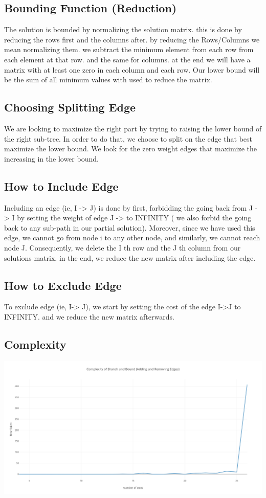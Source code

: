 \documentclass[11pt, english]{article}
\begin{document}
\subsection{Bounding Function (Reduction)}
The solution is bounded by normalizing the solution matrix. this is done by reducing the rows first and the columns after.
by reducing the Rows/Columns we mean normalizing them. we subtract the minimum element from each row from each element at that row. and the same for columns. at the end we will have a matrix with at least one zero in each column and each row.
Our lower bound will be the sum of all minimum values with used to reduce the matrix.

\subsection{Choosing Splitting Edge}
We are looking to maximize the right part by trying to raising the lower bound of the right sub-tree. In order to do that, we choose to split on the edge that best maximize the lower bound. We look for the zero weight edges that maximize the increasing in the lower bound.

\subsection{How to Include Edge}
Including an edge (ie, I -> J) is done by first, forbidding the going back from J -> I by setting the weight of edge J -> to INFINITY ( we also forbid the going back to any sub-path in our partial solution). Moreover, since we have used this edge, we cannot go from node i to any other node, and similarly, we cannot reach node J. Consequently, we delete the I th row and the J th column from our solutions matrix.
in the end, we reduce the new matrix after including the edge.

\subsection{How to Exclude Edge}
To exclude edge (ie, I-> J), we start by setting the cost of the edge I->J to INFINITY. and we reduce the new matrix afterwards.

\subsection{Complexity}

\begin{center}
\includegraphics[scale=0.22]{branchandbound.png}
\end{center}
\end{document}
